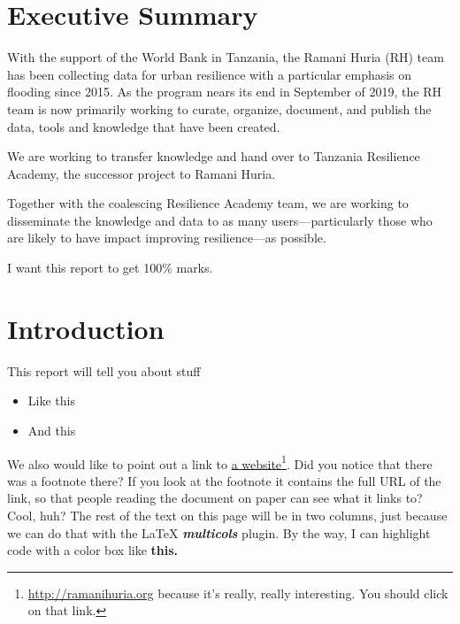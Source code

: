 \documentclass[a4paper,12pt,twoside]{article}
\begin{document}
\section{Executive Summary}
\label{executivesummary}
\begin{multicols}{2}
With the support of the World Bank in Tanzania, the Ramani Huria (RH) team has been collecting data for urban resilience with a particular emphasis on flooding since 2015. As the program nears its end in September of 2019, the RH team is now primarily working to curate, organize, document, and publish the data, tools and knowledge that have been created. 

\begin{mdframed}[hidealllines=true,backgroundcolor=blue!20,innerleftmargin=3pt,innerrightmargin=3pt,leftmargin=-3pt,rightmargin=-3pt]

We are working to transfer knowledge and hand over to Tanzania Resilience Academy, the successor project to Ramani Huria. 
\end{mdframed}

Together with the coalescing Resilience Academy team, we are working to disseminate the knowledge and data to as many users---particularly those who are likely to have impact improving resilience---as possible. 

I want this report to get 100\% marks. 

\end{multicols}


\newpage
\section{Introduction}
\label{Introduction}

This report will tell you about stuff

\begin{itemize}
  \item Like this
  \item And this
\end{itemize}

We also would like to point out a link to  \href{https://ramanihuria.org}{a website}\footnote{\url{http://ramanihuria.org}\color{RHgrey} { }because it's really, really interesting. You should click on that link.}. Did you notice that there was a footnote there? If you look at the footnote it contains the full URL of the link, so that people reading the document on paper can see what it links to? Cool, huh? The rest of the text on this page will be in two columns, just because we can do that with the \LaTeX{} \textbf{\textit{multicols}} plugin. By the way, I can highlight code with a color box like \textbf{\colorbox{code}{this.}}
\end{document}
